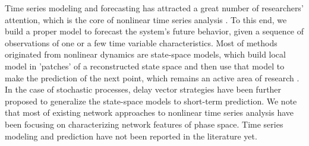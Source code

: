 \begin{enumerate}
	Time series modeling and forecasting has attracted a great number of researchers' attention, which is the core of nonlinear time series analysis \cite{kantz1997,Bradley2015c}. To this end, we build a proper model to forecast the system's future behavior, given a sequence of observations of one or a few time variable characteristics. Most of methods originated from nonlinear dynamics are state-space models, which build local model in 'patches' of a reconstructed state space and then use that model to make the prediction of the next point, which remains an active area of research \cite{Bradley2015c}. In the case of stochastic processes, delay vector strategies have been further proposed to generalize the state-space models to short-term prediction. We note that most of existing network approaches to nonlinear time series analysis have been focusing on characterizing network features of phase space. Time series modeling and prediction have not been reported in the literature yet.  

	\end{enumerate}
